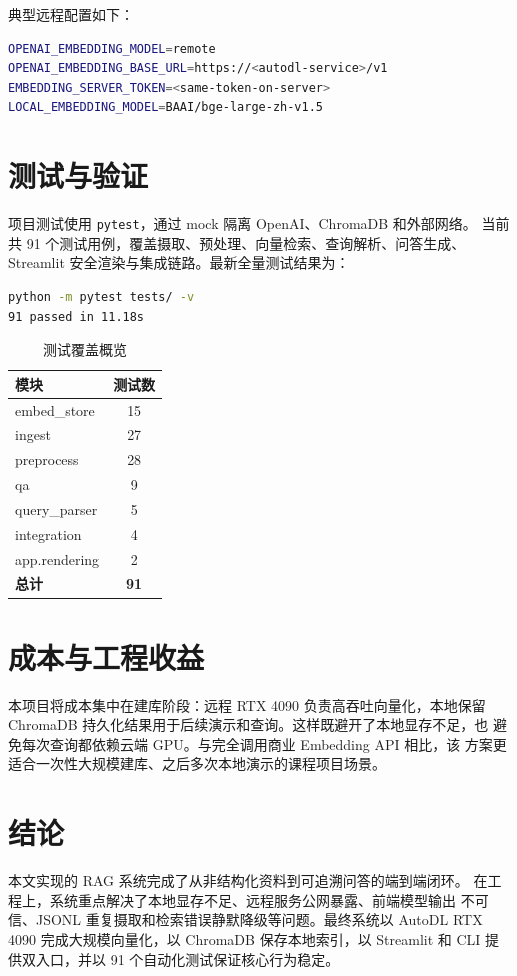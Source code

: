 \documentclass[conference]{IEEEtran}
\begin{document}
典型远程配置如下：
\begin{lstlisting}[language=bash,caption={远程 4090 向量化配置}]
OPENAI_EMBEDDING_MODEL=remote
OPENAI_EMBEDDING_BASE_URL=https://<autodl-service>/v1
EMBEDDING_SERVER_TOKEN=<same-token-on-server>
LOCAL_EMBEDDING_MODEL=BAAI/bge-large-zh-v1.5
\end{lstlisting}

\section{测试与验证}
项目测试使用 \texttt{pytest}，通过 mock 隔离 OpenAI、ChromaDB 和外部网络。
当前共 91 个测试用例，覆盖摄取、预处理、向量检索、查询解析、问答生成、
Streamlit 安全渲染与集成链路。最新全量测试结果为：

\begin{lstlisting}[language=bash,caption={测试结果}]
python -m pytest tests/ -v
91 passed in 11.18s
\end{lstlisting}

\begin{table}[!t]
\centering
\caption{测试覆盖概览}
\label{tab:tests}
\begin{tabular}{@{}lc@{}}
\toprule
\textbf{模块} & \textbf{测试数} \\
\midrule
embed\_store & 15 \\
ingest & 27 \\
preprocess & 28 \\
qa & 9 \\
query\_parser & 5 \\
integration & 4 \\
app.rendering & 2 \\
\midrule
\textbf{总计} & \textbf{91} \\
\bottomrule
\end{tabular}
\end{table}

\section{成本与工程收益}
本项目将成本集中在建库阶段：远程 RTX 4090 负责高吞吐向量化，本地保留
ChromaDB 持久化结果用于后续演示和查询。这样既避开了本地显存不足，也
避免每次查询都依赖云端 GPU。与完全调用商业 Embedding API 相比，该
方案更适合一次性大规模建库、之后多次本地演示的课程项目场景。

\section{结论}
本文实现的 RAG 系统完成了从非结构化资料到可追溯问答的端到端闭环。
在工程上，系统重点解决了本地显存不足、远程服务公网暴露、前端模型输出
不可信、JSONL 重复摄取和检索错误静默降级等问题。最终系统以 AutoDL
RTX 4090 完成大规模向量化，以 ChromaDB 保存本地索引，以 Streamlit 和
CLI 提供双入口，并以 91 个自动化测试保证核心行为稳定。
\end{document}
